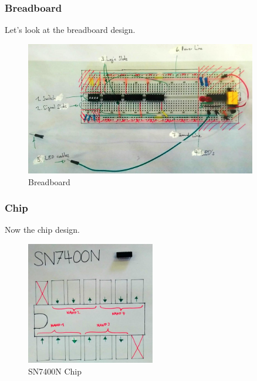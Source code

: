 \documentclass{beamer}
\begin{document}
\begin{frame}  \frametitle{Breadboard}
Let's look at the breadboard design.
    \begin{figure}[H]
      \centering
      \includegraphics[width=0.9\textwidth]{breadboard_labeled}%
      \caption{Breadboard}%
      \label{fig:breadboard_labelled}
    \end{figure}
\end{frame}

\begin{frame}  \frametitle{Chip}
Now the chip design.
    \begin{figure}[H]
      \centering
      \includegraphics[width=0.5\textwidth]{sn7400n}%
      \caption{SN7400N Chip}%
      \label{fig:sn7400n}
    \end{figure}
\end{frame}
\end{document}
